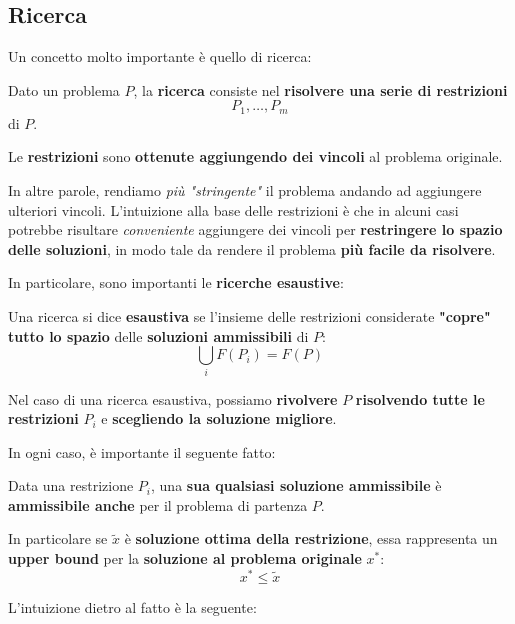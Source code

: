 \subsection{Ricerca}

Un concetto molto importante è quello di ricerca:

\begin{definition}[RICERCA]
    Dato un problema $P$, la \textbf{ricerca} consiste nel \textbf{risolvere una serie di
    restrizioni} 
    \[
        P_{1}, \ldots , P_m 
    \] 
    di $P$.

    Le \textbf{restrizioni} sono \textbf{ottenute aggiungendo dei vincoli} al
    problema originale.
\end{definition}

In altre parole, rendiamo \textit{più "stringente"} il problema andando ad aggiungere
ulteriori vincoli. L'intuizione alla base delle restrizioni è che in alcuni casi
potrebbe risultare \textit{conveniente} aggiungere dei vincoli per \textbf{restringere 
lo spazio delle soluzioni}, in modo tale da rendere il problema \textbf{più
facile da risolvere}.

In particolare, sono importanti le \textbf{ricerche esaustive}:

\begin{definition}
    Una ricerca si dice \textbf{esaustiva} se l'insieme delle restrizioni considerate
    \textbf{"copre" tutto lo spazio} delle \textbf{soluzioni ammissibili} di $P$:
    \[
        \bigcup_i F(P_i) = F(P)
    \] 
\end{definition}

Nel caso di una ricerca esaustiva, possiamo \textbf{rivolvere} $P$ \textbf{risolvendo
tutte le restrizioni} $P_i$ e \textbf{scegliendo la soluzione migliore}.

In ogni caso, è importante il seguente fatto:

\begin{prop}
    Data una restrizione $P_i$, una \textbf{sua qualsiasi soluzione
    ammissibile} è \textbf{ammissibile anche} per il problema di partenza $P$.

    In particolare se $\tilde{x}$ è \textbf{soluzione ottima della restrizione}, essa
    rappresenta un \textbf{upper bound} per la \textbf{soluzione al problema 
    originale} $x^{*}$:
    \[
        x^* \le \tilde{x}
    \] 
\end{prop}

L'intuizione dietro al fatto è la seguente:

